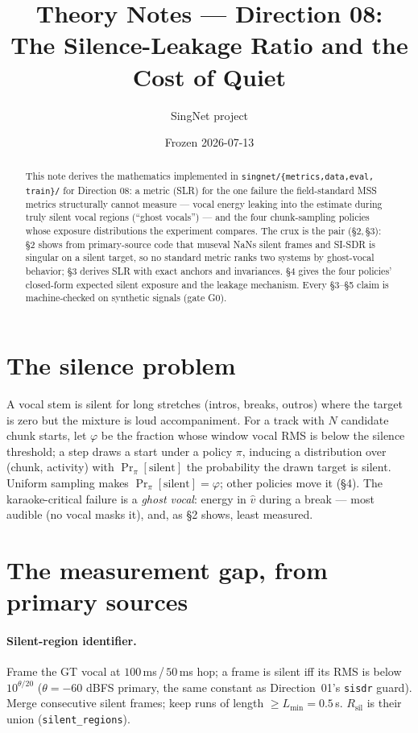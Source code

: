 \documentclass[11pt]{article}
\title{Theory Notes --- Direction 08:\\
The Silence-Leakage Ratio and the Cost of Quiet}
\author{SingNet project}
\date{Frozen 2026-07-13}
\newcommand{\code}[1]{\texttt{#1}}
\newcommand{\vhat}{\hat v}
\newcommand{\Rsil}{R_{\text{sil}}}
\newcommand{\Prsil}[1]{\Pr_{#1}[\text{silent}]}
\begin{document}
\maketitle

\begin{abstract}
This note derives the mathematics implemented in \code{singnet/\{metrics,data,eval,
train\}/} for Direction 08: a metric (SLR) for the one failure the field-standard MSS
metrics structurally cannot measure --- vocal energy leaking into the estimate during
truly silent vocal regions (``ghost vocals'') --- and the four chunk-sampling policies
whose exposure distributions the experiment compares. The crux is the pair (\S2,\,\S3):
\S2 shows from primary-source code that museval NaNs silent frames and SI-SDR is singular
on a silent target, so no standard metric ranks two systems by ghost-vocal behavior; \S3
derives SLR with exact anchors and invariances. \S4 gives the four policies' closed-form
expected silent exposure and the leakage mechanism. Every \S3--\S5 claim is machine-checked
on synthetic signals (gate G0).
\end{abstract}

\section{The silence problem}
A vocal stem is silent for long stretches (intros, breaks, outros) where the target is zero
but the mixture is loud accompaniment. For a track with $N$ candidate chunk starts, let
$\varphi$ be the fraction whose window vocal RMS is below the silence threshold; a step
draws a start under a policy $\pi$, inducing a distribution over (chunk, activity) with
$\Prsil{\pi}$ the probability the drawn target is silent. Uniform sampling makes
$\Prsil{\pi} = \varphi$; other policies move it (\S4). The karaoke-critical failure is a
\emph{ghost vocal}: energy in $\vhat$ during a break --- most audible (no vocal masks it),
and, as \S2 shows, least measured.

\section{The measurement gap, from primary sources}

\paragraph{Silent-region identifier.} Frame the GT vocal at $100$\,ms\,/\,$50$\,ms hop; a
frame is silent iff its RMS is below $10^{\theta/20}$ ($\theta=-60$ dBFS primary, the same
constant as Direction~01's \code{sisdr} guard). Merge consecutive silent frames; keep runs
of length $\ge L_{\min}=0.5$\,s. $\Rsil$ is their union
(\code{silent\_regions}).
\end{document}
